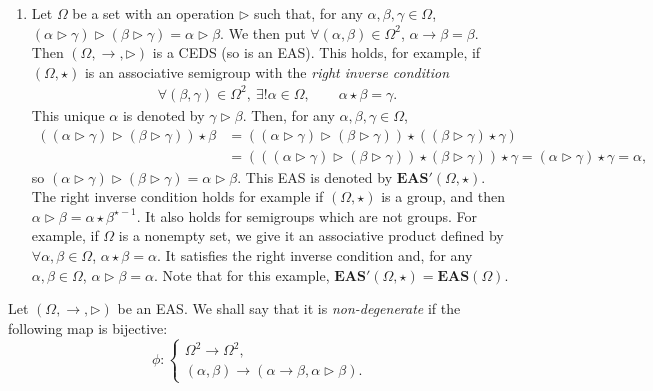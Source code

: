 \documentclass[10pt,a4paper]{amsart}
\numberwithin{equation}{section}
\newcommand{\eas}{\mathbf{EAS}}
\begin{document}
\begin{Example}
\begin{enumerate}
\item[(3)] Let $\Omega$ be a set with an operation $\triangleright$ such that, for any $\alpha,\beta,\gamma\in \Omega$,
$(\alpha \triangleright \gamma)\triangleright (\beta\triangleright \gamma)=\alpha \triangleright \beta$.
We then put
$\forall (\alpha,\beta)\in \Omega^2$, $\alpha\rightarrow \beta =\beta$.
Then $(\Omega,\rightarrow,\triangleright)$ is a CEDS (so is an EAS). This holds, for example, if $(\Omega,\star)$ is an associative semigroup with the \emph{right inverse condition}
\begin{align*}
&\forall (\beta,\gamma)\in \Omega^2, \ \exists! \alpha \in \Omega,\qquad \alpha\star \beta=\gamma.
\end{align*}
This unique $\alpha$ is denoted by $\gamma \triangleright \beta$. Then, for any $\alpha,\beta,\gamma \in \Omega$,
\begin{align*}
((\alpha \triangleright \gamma)\triangleright (\beta\triangleright \gamma))\star \beta&=((\alpha \triangleright \gamma)\triangleright (\beta\triangleright \gamma))\star ((\beta \triangleright \gamma)\star \gamma)\\
&=(((\alpha \triangleright \gamma)\triangleright (\beta\triangleright \gamma))\star (\beta \triangleright \gamma))\star \gamma
=(\alpha \triangleright \gamma)\star \gamma=\alpha,
\end{align*}
so $(\alpha \triangleright \gamma)\triangleright (\beta\triangleright \gamma)=\alpha \triangleright \beta$. This EAS is denoted by $\eas'(\Omega,\star)$.
The right inverse condition holds for example if $(\Omega,\star)$ is a group, and then
$\alpha \triangleright \beta=\alpha \star \beta^{\star-1}$.
It also holds for semigroups which are not groups. For example, if $\Omega$ is a nonempty set, we give it an associative product defined by
$\forall \alpha,\beta\in \Omega$, $ \alpha \star \beta=\alpha$.
It satisfies the right inverse condition and, for any $\alpha,\beta \in \Omega$, $\alpha \triangleright \beta=\alpha$. Note that for this example, $\eas'(\Omega,\star)=\eas(\Omega)$.
\end{enumerate}\end{Example}

\begin{Definition} \label{defi2.4}
Let $(\Omega,\rightarrow,\triangleright)$ be an EAS. We shall say that it is \emph{non-degenerate} if the following map is bijective:
\[\phi\colon \begin{cases}
\Omega^2\longrightarrow\Omega^2,\\
(\alpha,\beta)\longrightarrow(\alpha\rightarrow\beta,\alpha \triangleright\beta).
\end{cases}\]
\end{Definition}
\end{document}
